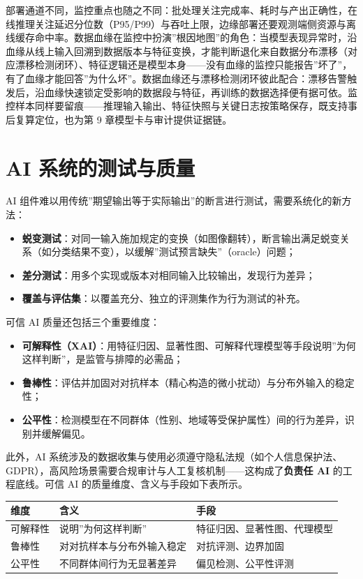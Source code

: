 \documentclass[
]{ctexbook}
\providecommand{\tightlist}{\setlength{\itemsep}{0pt}\setlength{\parskip}{0pt} }
\newcounter{none}
\begin{document}
部署通道不同，监控重点也随之不同：批处理关注完成率、耗时与产出正确性，在线推理关注延迟分位数（P95/P99）与吞吐上限，边缘部署还要观测端侧资源与离线缓存命中率。数据血缘在监控中扮演''根因地图''的角色：当模型表现异常时，沿血缘从线上输入回溯到数据版本与特征变换，才能判断退化来自数据分布漂移（对应漂移检测闭环）、特征逻辑还是模型本身------没有血缘的监控只能报告''坏了''，有了血缘才能回答''为什么坏''。数据血缘还与漂移检测闭环彼此配合：漂移告警触发后，沿血缘快速锁定受影响的数据段与特征，再训练的数据选择便有据可依。监控样本同样要留痕------推理输入输出、特征快照与关键日志按策略保存，既支持事后复算定位，也为第
9 章模型卡与审计提供证据链。

\section{AI
系统的测试与质量}\label{ai-ux7cfbux7edfux7684ux6d4bux8bd5ux4e0eux8d28ux91cf}

AI
组件难以用传统''期望输出等于实际输出''的断言进行测试，需要系统化的新方法：

\begin{itemize}
\tightlist
\item
  \textbf{蜕变测试}：对同一输入施加规定的变换（如图像翻转），断言输出满足蜕变关系（如分类结果不变），以缓解''测试预言缺失''（oracle）问题；
\item
  \textbf{差分测试}：用多个实现或版本对相同输入比较输出，发现行为差异；
\item
  \textbf{覆盖与评估集}：以覆盖充分、独立的评测集作为行为测试的补充。
\end{itemize}

可信 AI 质量还包括三个重要维度：

\begin{itemize}
\tightlist
\item
  \textbf{可解释性（XAI）}：用特征归因、显著性图、可解释代理模型等手段说明''为何这样判断''，是监管与排障的必需品；
\item
  \textbf{鲁棒性}：评估并加固对对抗样本（精心构造的微小扰动）与分布外输入的稳定性；
\item
  \textbf{公平性}：检测模型在不同群体（性别、地域等受保护属性）间的行为差异，识别并缓解偏见。
\end{itemize}

此外，AI
系统涉及的数据收集与使用必须遵守隐私法规（如个人信息保护法、GDPR），高风险场景需要合规审计与人工复核机制------这构成了\textbf{负责任
AI} 的工程底线。可信 AI 的质量维度、含义与手段如下表所示。

{\def\LTcaptype{none} %
\begin{longtable}[]{@{}lll@{}}
\toprule\noalign{}
维度 & 含义 & 手段 \\
\midrule\noalign{}
\endhead
\bottomrule\noalign{}
\endlastfoot
可解释性 & 说明''为何这样判断'' & 特征归因、显著性图、代理模型 \\
鲁棒性 & 对对抗样本与分布外输入稳定 & 对抗评测、边界加固 \\
公平性 & 不同群体间行为无显著差异 & 偏见检测、公平性评测 \\
\end{longtable}
}
\end{document}
